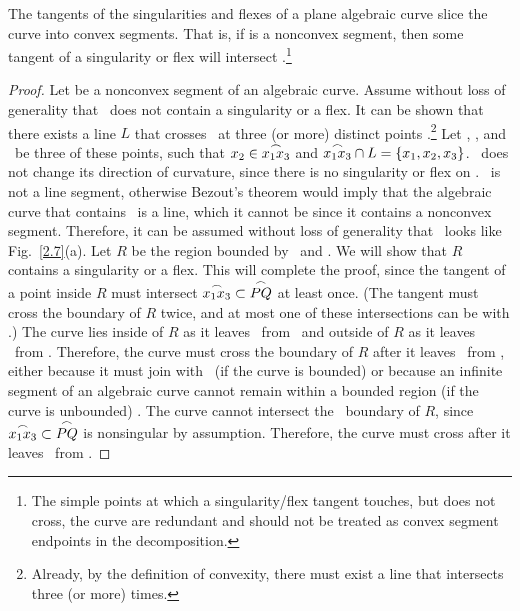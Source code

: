 \begin{theorem}
\label{deke}
The tangents of the singularities and flexes of a plane algebraic curve 
slice
the curve into convex segments.  That is, if  is a nonconvex 
segment, then some tangent of a singularity or flex will intersect 
.\footnote{The simple points at which a singularity/flex 
	tangent touches, but does not cross, the curve are redundant and 
	should 
	not be treated as convex segment endpoints in the decomposition.}
\end{theorem}
%
%
\begin{proof}
Let  be a nonconvex segment of an algebraic curve.
Assume without loss of generality that \pq\ does not contain a 
singularity or 
a flex.
It can be shown that there exists a line $L$ that crosses \pq\ at three 
(or more) distinct points \cite[p. 117]{jj}.\footnote{Already, by 
the definition
	of convexity, there must exist a line that intersects  three
	(or more) times.}
Let \xo, \xt, and \xth\ be three of these points, such that 
$\mbox{$x_{2}$} \in \mbox{$\stackrel{\frown}{\mbox{$x_{1}$}\mbox{$x_{3}$}}$}$ 
and \mbox{$\mbox{$\stackrel{\frown}{\mbox{$x_{1}$}\mbox{$x_{3}$}}$} \cap L = \{ \mbox{$x_{1}$},\mbox{$x_{2}$},\mbox{$x_{3}$}\}$}.
\xotha\ does not change its direction of curvature, since there is no 
singularity or flex on \pq.
\xotha\ is not a line segment, otherwise Bezout's theorem would imply that
the algebraic curve that contains \xotha\ is a line, which it cannot be 
since
it contains a nonconvex segment.
Therefore, it can be assumed without loss of generality that \xotha\ 
looks like 
Fig.~\ref{2.7}(a).
Let $R$ be the region bounded by \xotha\ and \seg{\xo\xth}.
We will show that $R$ contains a singularity or a flex.
This will complete the proof, since the tangent
of a point inside $R$ must intersect $\mbox{$\stackrel{\frown}{\mbox{$x_{1}$}\mbox{$x_{3}$}}$} \subset \mbox{$\stackrel{\frown}{PQ}$}$ at least once.
(The tangent must cross the boundary of $R$ twice, and at most one of these
intersections can be with 
\seg{\xo\xth}.)
The curve lies inside of $R$ as it leaves \xotha\ from \xo\ and outside 
of $R$ as it leaves \xotha\ from \xth.
Therefore, the curve must cross the boundary of $R$ after it leaves \xotha\
from \xo, either because it must join with \xth\ (if the curve is bounded)
or because an infinite segment of an algebraic curve
cannot remain within a bounded region (if the curve is unbounded) 
\cite[p. 116]{jj}.
The curve cannot intersect the \xotha\ boundary of $R$, since
\mbox{$\mbox{$\stackrel{\frown}{\mbox{$x_{1}$}\mbox{$x_{3}$}}$} \subset \mbox{$\stackrel{\frown}{PQ}$}$} is nonsingular by assumption.
Therefore, the curve must cross \seg{\xo\xth} after it leaves
\xotha\ from \xo.


\end{proof}
